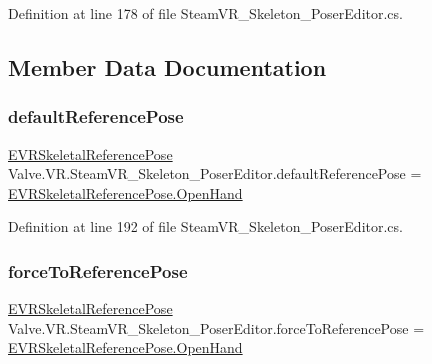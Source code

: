 Definition at line 178 of file Steam\+V\+R\+\_\+\+Skeleton\+\_\+\+Poser\+Editor.\+cs.



\subsection{Member Data Documentation}
\mbox{\label{class_valve_1_1_v_r_1_1_steam_v_r___skeleton___poser_editor_ac446969b5aaaa2bd8fd4515dc7eac188}} 
\subsubsection{\texorpdfstring{defaultReferencePose}{defaultReferencePose}}
{\footnotesize\ttfamily \mbox{\hyperlink{namespace_valve_1_1_v_r_a299b655881f873256f035349b59da09e}{E\+V\+R\+Skeletal\+Reference\+Pose}} Valve.\+V\+R.\+Steam\+V\+R\+\_\+\+Skeleton\+\_\+\+Poser\+Editor.\+default\+Reference\+Pose = \mbox{\hyperlink{namespace_valve_1_1_v_r_a299b655881f873256f035349b59da09eaad39746cdba57cad436b509f2f991d22}{E\+V\+R\+Skeletal\+Reference\+Pose.\+Open\+Hand}}\hspace{0.3cm}{\ttfamily [protected]}}



Definition at line 192 of file Steam\+V\+R\+\_\+\+Skeleton\+\_\+\+Poser\+Editor.\+cs.

\mbox{\label{class_valve_1_1_v_r_1_1_steam_v_r___skeleton___poser_editor_ac9a14861334577353dddafd5f35f5b0f}} 
\subsubsection{\texorpdfstring{forceToReferencePose}{forceToReferencePose}}
{\footnotesize\ttfamily \mbox{\hyperlink{namespace_valve_1_1_v_r_a299b655881f873256f035349b59da09e}{E\+V\+R\+Skeletal\+Reference\+Pose}} Valve.\+V\+R.\+Steam\+V\+R\+\_\+\+Skeleton\+\_\+\+Poser\+Editor.\+force\+To\+Reference\+Pose = \mbox{\hyperlink{namespace_valve_1_1_v_r_a299b655881f873256f035349b59da09eaad39746cdba57cad436b509f2f991d22}{E\+V\+R\+Skeletal\+Reference\+Pose.\+Open\+Hand}}\hspace{0.3cm}{\ttfamily [protected]}}



